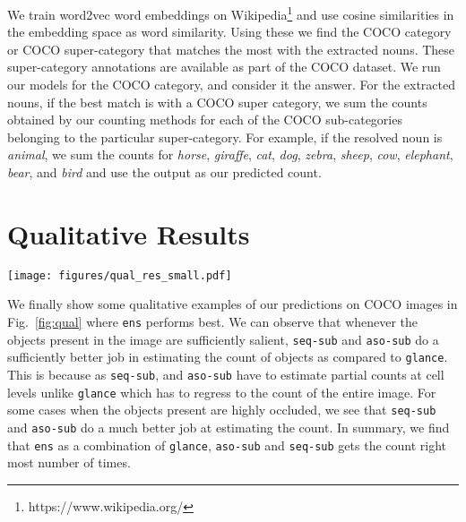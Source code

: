 \documentclass[10pt,twocolumn,letterpaper]{article}
\newcommand{\detect}{\texttt{detect}\xspace}
\newcommand{\sub}{\texttt{aso-sub}\xspace}
\newcommand{\seq}{\texttt{seq-sub}\xspace}
\newcommand{\glance}{\texttt{glance}\xspace}
\newcommand{\ens}{\texttt{ens}\xspace}
\newcommand{\reffig}[1]{Fig.~\ref{#1}}
\begin{document}
We train word2vec word embeddings on Wikipedia\footnote{https://www.wikipedia.org/} and use cosine similarities in the embedding space as word similarity. Using these we find the COCO category or COCO super-category that matches the most with the extracted nouns. These super-category annotations are available as part of the COCO dataset. We run our models for the COCO category, and consider it the answer. For the extracted nouns, if the best match is with a COCO super category, we sum the counts obtained by our counting methods for each of the COCO sub-categories belonging to the particular super-category. For example, if the resolved noun is \emph{animal}, we sum the counts for \emph{horse}, \emph{giraffe}, \emph{cat}, \emph{dog}, \emph{zebra}, \emph{sheep}, \emph{cow}, \emph{elephant}, \emph{bear}, and \emph{bird} and use the output as our predicted count. \section{Qualitative Results}\label{sec:qual}
\begin{figure*}
\texttt{[image: figures/qual\_res\_small.pdf]}
\caption{Some qualitative examples of the predictions given by our models where \ens performs well. We can see that in cases where the objects are significantly occluded, \detect has very poor performance compared to \seq or \ens.} 
\label{fig:qual}
\end{figure*}
We finally show some qualitative examples of our predictions on COCO images in \reffig{fig:qual} where \ens performs best. We can observe that whenever the objects present in the image are sufficiently salient, \seq and \sub do a sufficiently better job in estimating the count of objects as compared to \glance. This is because as \seq, and \sub have to estimate partial counts at cell levels unlike \glance which has to regress to the count of the entire image. For some cases when the objects present are highly occluded, we see that \seq  and \sub do a much better job at estimating the count. In summary, we find that \ens as a combination of \glance, \sub and \seq gets the count right most number of times. 





%
 
\end{document}
